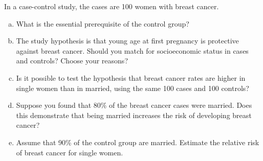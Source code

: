
In a case-control study, the cases are 100 women with breast cancer.
\begin{enumerate}[(a)]
\item What is the essential prerequisite of the control group?
\answerSpace{.7in}
\item The study hypothesis is that young age at first pregnancy is
  protective against breast cancer.  Should you match for
  socioeconomic status in cases and controls?  Choose your reasons?
\answerSpace{.7in}
\item Is it possible to test the hypothesis that breast cancer rates
  are higher in single women than in married, using the same 100 cases
  and 100 controls?
\answerSpace{.7in}
\item Suppose you found that 80\% of the breast cancer cases were
  married.  Does this demonstrate that being married increases the
  risk of developing breast cancer?
\answerSpace{.7in}
\item Assume that 90\% of the control group are married.  Estimate the
  relative risk of breast cancer for single women.
\answerSpace{.7in}
\end{enumerate}


